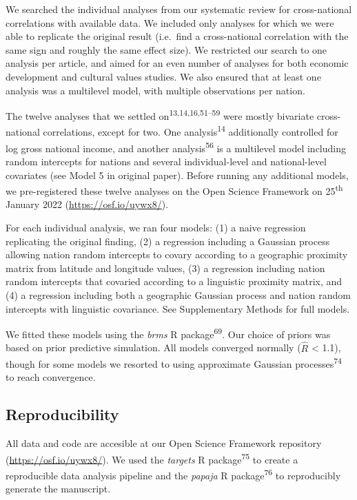\documentclass[english,man,floatsintext]{apa6}
\begin{document}
We searched the individual analyses from our systematic review for cross-national correlations with available data. We included only analyses for which we were able to replicate the original result (i.e.~find a cross-national correlation with the same sign and roughly the same effect size). We restricted our search to one analysis per article, and aimed for an even number of analyses for both economic development and cultural values studies. We also ensured that at least one analysis was a multilevel model, with multiple observations per nation.

The twelve analyses that we settled on\textsuperscript{13,14,16,51--59} were mostly bivariate cross-national correlations, except for two. One analysis\textsuperscript{14} additionally controlled for log gross national income, and another analysis\textsuperscript{56} is a multilevel model including random intercepts for nations and several individual-level and national-level covariates (see Model 5 in original paper). Before running any additional models, we pre-registered these twelve analyses on the Open Science Framework on 25\textsuperscript{th} January 2022 (\url{https://osf.io/uywx8/}).

For each individual analysis, we ran four models: (1) a naive regression replicating the original finding, (2) a regression including a Gaussian process allowing nation random intercepts to covary according to a geographic proximity matrix from latitude and longitude values, (3) a regression including nation random intercepts that covaried according to a linguistic proximity matrix, and (4) a regression including both a geographic Gaussian process and nation random intercepts with linguistic covariance. See Supplementary Methods for full models.

We fitted these models using the \emph{brms} R package\textsuperscript{69}. Our choice of priors was based on prior predictive simulation. All models converged normally (\(\hat{R}\) \textless{} 1.1), though for some models we resorted to using approximate Gaussian processes\textsuperscript{74} to reach convergence.

\hypertarget{reproducibility}{%
\subsection{Reproducibility}\label{reproducibility}}

All data and code are accesible at our Open Science Framework repository (\url{https://osf.io/uywx8/}). We used the \emph{targets} R package\textsuperscript{75} to create a reproducible data analysis pipeline and the \emph{papaja} R package\textsuperscript{76} to reproducibly generate the manuscript.
\end{document}

